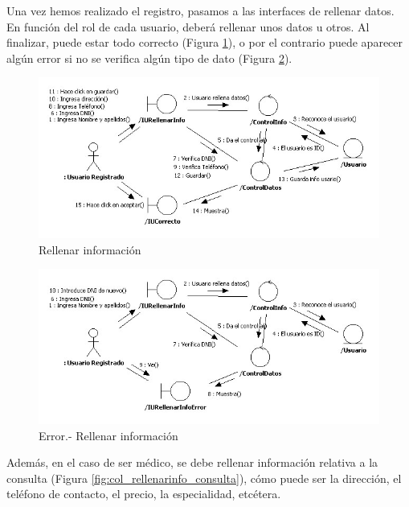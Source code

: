 \documentclass[a4paper,oneside,11pt]{book}
\begin{document}
			Una vez hemos realizado el registro, pasamos a las interfaces de rellenar datos. En función del rol de cada usuario, deberá rellenar unos datos u otros. Al finalizar, puede estar todo correcto (Figura \ref{fig:col_rellenarinfo}), o por el contrario puede aparecer algún error si no se verifica algún tipo de dato (Figura \ref{fig:col_rellenarinfo_err}).
			
			\begin{figure}[H]
			  \centering
			    \includegraphics[width=16cm]{img/jpg/colaboraciones/19_RellenarInfo.jpg}
			  \caption{Rellenar información}
			  \label{fig:col_rellenarinfo}
			\end{figure}
			
			\begin{figure}[H]
			  \centering
			    \includegraphics[width=16cm]{img/jpg/colaboraciones/20_RellenarInfoError.jpg}
			  \caption{Error.- Rellenar información}
			  \label{fig:col_rellenarinfo_err}
			\end{figure}
			
			Además, en el caso de ser médico, se debe rellenar información relativa a la consulta (Figura \ref{fig:col_rellenarinfo_consulta}), cómo puede ser la dirección, el teléfono de contacto, el precio, la especialidad, etcétera.
			
\end{document}
